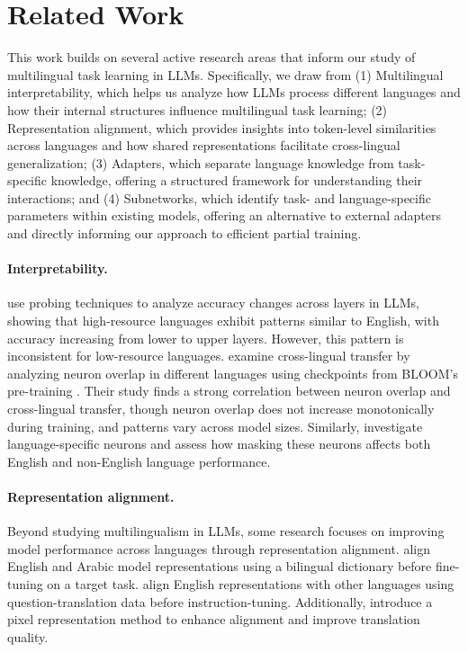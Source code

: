 \section{Related Work}
This work builds on several active research areas that inform our study of multilingual task learning in LLMs. Specifically, we draw from (1) Multilingual interpretability, which helps us analyze how LLMs process different languages and how their internal structures influence multilingual task learning; (2) Representation alignment, which provides insights into token-level similarities across languages and how shared representations facilitate cross-lingual generalization; (3) Adapters, which separate language knowledge from task-specific knowledge, offering a structured framework for understanding their interactions; and (4) Subnetworks, which identify task- and language-specific parameters within existing models, offering an alternative to external adapters and directly informing our approach to efficient partial training.  


\paragraph{Interpretability.}
\citet{li2024exploring} use probing techniques to analyze accuracy changes across layers in LLMs, showing that high-resource languages exhibit patterns similar to English, with accuracy increasing from lower to upper layers. However, this pattern is inconsistent for low-resource languages. \citet{wang2024probing} examine cross-lingual transfer by analyzing neuron overlap in different languages using checkpoints from BLOOM’s pre-training \citep{le2023bloom}. Their study finds a strong correlation between neuron overlap and cross-lingual transfer, though neuron overlap does not increase monotonically during training, and patterns vary across model sizes. Similarly, \citet{zhao2024large} investigate language-specific neurons and assess how masking these neurons affects both English and non-English language performance.   


\paragraph{Representation alignment.}

Beyond studying multilingualism in LLMs, some research focuses on improving model performance across languages through representation alignment. \citet{gaschi-etal-2023-exploring} align English and Arabic model representations using a bilingual dictionary before fine-tuning on a target task. \citet{zhang-etal-2024-getting} align English representations with other languages using question-translation data before instruction-tuning. Additionally, \citet{salesky-etal-2023-multilingual} introduce a pixel representation method to enhance alignment and improve translation quality.   



